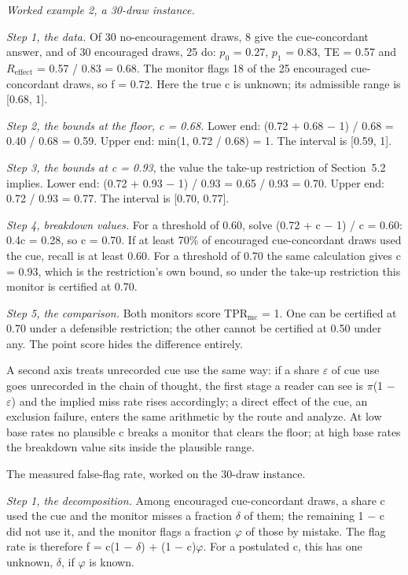 \documentclass[11pt]{article}
\begin{document}
\emph{Worked example 2, a 30-draw instance.}

\emph{Step 1, the data.} Of 30 no-encouragement draws, 8 give the cue-concordant answer, and of 30 encouraged draws, 25 do: $p_0$ = 0.27, $p_1$ = 0.83, TE = 0.57 and $R_{\mathrm{effect}}$ = 0.57 / 0.83 = 0.68. The monitor flags 18 of the 25 encouraged cue-concordant draws, so f = 0.72. Here the true c is unknown; its admissible range is [0.68, 1].

\emph{Step 2, the bounds at the floor, c = 0.68.} Lower end: (0.72 + 0.68 $-$ 1) / 0.68 = 0.40 / 0.68 = 0.59. Upper end: min(1, 0.72 / 0.68) = 1. The interval is [0.59, 1].

\emph{Step 3, the bounds at c = 0.93}, the value the take-up restriction of Section~5.2 implies. Lower end: (0.72 + 0.93 $-$ 1) / 0.93 = 0.65 / 0.93 = 0.70. Upper end: 0.72 / 0.93 = 0.77. The interval is [0.70, 0.77].

\emph{Step 4, breakdown values.} For a threshold of 0.60, solve (0.72 + c $-$ 1) / c = 0.60: 0.4c = 0.28, so c = 0.70. If at least 70\% of encouraged cue-concordant draws used the cue, recall is at least 0.60. For a threshold of 0.70 the same calculation gives c = 0.93, which is the restriction's own bound, so under the take-up restriction this monitor is certified at 0.70.

\emph{Step 5, the comparison.} Both monitors score $\mathrm{TPR}_{\mathrm{mc}}$ = 1. One can be certified at 0.70 under a defensible restriction; the other cannot be certified at 0.50 under any. The point score hides the difference entirely.

A second axis treats unrecorded cue use the same way: if a share $\varepsilon$ of cue use goes unrecorded in the chain of thought, the first stage a reader can see is $\pi$(1 $-$ $\varepsilon$) and the implied miss rate rises accordingly; a direct effect of the cue, an exclusion failure, enters the same arithmetic by the route \citet{jo2002estimation} and \citet{conley2012plausibly} analyze. At low base rates no plausible c breaks a monitor that clears the floor; at high base rates the breakdown value sits inside the plausible range.

The measured false-flag rate, worked on the 30-draw instance.

\emph{Step 1, the decomposition.} Among encouraged cue-concordant draws, a share c used the cue and the monitor misses a fraction $\delta$ of them; the remaining 1 $-$ c did not use it, and the monitor flags a fraction $\varphi$ of those by mistake. The flag rate is therefore f = c(1 $-$ $\delta$) + (1 $-$ c)$\varphi$. For a postulated c, this has one unknown, $\delta$, if $\varphi$ is known.
\end{document}
